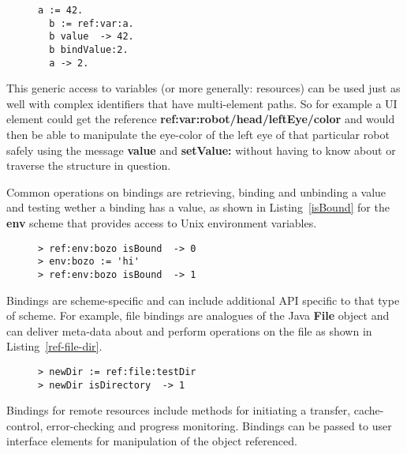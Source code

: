 \documentclass[preprint,authoryear]{acm_proc_article-sp}
\begin{document}
\begin{figure}[htbp]
\begin{lstlisting}[style=L,label=ref-binding,caption=Accessing a variable via its binding.]
  a := 42.
  b := ref:var:a.
  b value  -> 42.
  b bindValue:2.
  a -> 2.
\end{lstlisting}
\end{figure}

This generic access to variables (or more generally: resources) can be used just as well
with complex identifiers that have multi-element paths.  So for example a UI element
could get the reference {\bf ref:var:robot/head/leftEye/color} and would then be
able to manipulate the eye-color of the left eye of that particular robot safely using
the message {\bf value} and {\bf setValue:}
without having to know about or traverse the structure in question.

Common operations on bindings are retrieving, binding and unbinding a value and testing 
wether a binding has a value, as shown in Listing~\ref{isBound} for the {\bf env} scheme
that provides access to Unix environment variables.


\begin{figure}[htbp]
\begin{lstlisting}[style=L,label=isBound,caption=Is environment variable set?]
> ref:env:bozo isBound  -> 0
> env:bozo := 'hi'
> ref:env:bozo isBound  -> 1
\end{lstlisting}
\end{figure}

Bindings are scheme-specific and can include additional API specific to that type of scheme.
For example, file bindings are analogues of the Java {\bf File} object and can deliver
meta-data about and perform operations on the file as shown in Listing~\ref{ref-file-dir}.


\begin{figure}[htbp]
\begin{lstlisting}[style=L,label=ref-file-dir,caption=File and directory manipulation.]
> newDir := ref:file:testDir 
> newDir isDirectory  -> 1
\end{lstlisting}
\end{figure}

Bindings for remote resources include methods for initiating a transfer, cache-control,
error-checking and progress monitoring.   Bindings can be passed to user interface
elements for manipulation of the object referenced.
\end{document}
